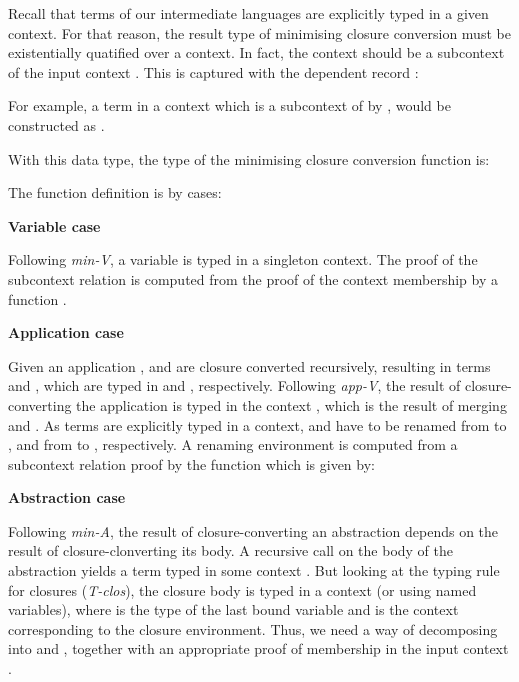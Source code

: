 \documentclass[bsc,frontabs,twoside,singlespacing,parskip,deptreport]{infthesis}
\theoremstyle{definition}
\begin{document}
Recall that terms of our intermediate languages are explicitly typed
in a given context. For that reason, the result type of minimising
closure conversion must be existentially quatified over a
context. In fact, the context should be a subcontext of the input
context . This is captured with the dependent record
:


For example, a term  in a context  which is a subcontext
of  by , would be constructed as .

With this data type, the type of the minimising closure conversion
function is:


The function definition is by cases:

\textbf{Variable case}


Following \textit{min-V}, a variable is typed in a singleton
context. The proof of the subcontext relation is computed from the
proof of the context membership by a function .

\textbf{Application case}


Given an application ,  and  are closure
converted recursively, resulting in terms  and , which
are typed in  and , respectively. Following
\textit{app-V}, the result of closure-converting the application is
typed in the context , which is the result of merging 
and . As terms are explicitly typed in a context,  and
 have to be renamed from  to , and from 
to , respectively. A renaming environment is computed from a
subcontext relation proof by the function  which is given by:


\textbf{Abstraction case}


Following \textit{min-A}, the result of closure-converting an
abstraction depends on the result  of closure-clonverting its
body. A recursive call on the body of the abstraction yields a term
typed in some context . But looking at the typing rule for
closures (\textit{T-clos}), the closure body is typed in a context
 (or  using named variables), where  is
the type of the last bound variable and  is the context
corresponding to the closure environment. Thus, we need a way of
decomposing  into  and , together with an
appropriate proof of membership in the input context .
\end{document}
